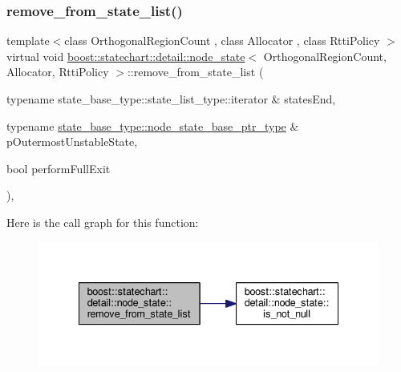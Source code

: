 \subsubsection{\texorpdfstring{remove\+\_\+from\+\_\+state\+\_\+list()}{remove\_from\_state\_list()}}
{\footnotesize\ttfamily template$<$class Orthogonal\+Region\+Count , class Allocator , class Rtti\+Policy $>$ \\
virtual void \mbox{\hyperlink{classboost_1_1statechart_1_1detail_1_1node__state}{boost\+::statechart\+::detail\+::node\+\_\+state}}$<$ Orthogonal\+Region\+Count, Allocator, Rtti\+Policy $>$\+::remove\+\_\+from\+\_\+state\+\_\+list (\begin{DoxyParamCaption}\item[{typename state\+\_\+base\+\_\+type\+::state\+\_\+list\+\_\+type\+::iterator \&}]{states\+End,  }\item[{typename \mbox{\hyperlink{classboost_1_1statechart_1_1detail_1_1state__base_a8e3dd0f80bf95d7df21417a50f1dbaa1}{state\+\_\+base\+\_\+type\+::node\+\_\+state\+\_\+base\+\_\+ptr\+\_\+type}} \&}]{p\+Outermost\+Unstable\+State,  }\item[{bool}]{perform\+Full\+Exit }\end{DoxyParamCaption})\hspace{0.3cm}{\ttfamily [inline]}, {\ttfamily [virtual]}}

Here is the call graph for this function\+:
\nopagebreak
\begin{figure}[H]
\begin{center}
\leavevmode
\includegraphics[width=335pt]{classboost_1_1statechart_1_1detail_1_1node__state_a1022b2fe0c4ea5f8b47d6fd1fb7e7ffb_cgraph}
\end{center}
\end{figure}
\mbox{\label{classboost_1_1statechart_1_1detail_1_1node__state_ab1c9cbc3ca4599a9f1633cb93cebd385}} 
